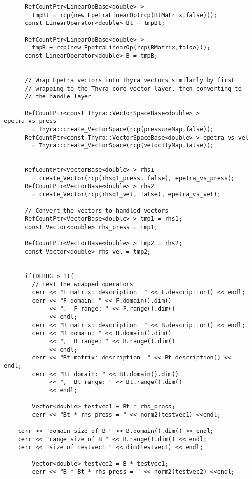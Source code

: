 \documentclass[oneeqnum,onefignum,onetabnum,10pt]{SANDreport}
\begin{document}
\begin{verbatim}
      RefCountPtr<LinearOpBase<double> >
        tmpBt = rcp(new EpetraLinearOp(rcp(BtMatrix,false)));
      const LinearOperator<double> Bt = tmpBt;

      RefCountPtr<LinearOpBase<double> >
        tmpB = rcp(new EpetraLinearOp(rcp(BMatrix,false)));
      const LinearOperator<double> B = tmpB;


      // Wrap Epetra vectors into Thyra vectors similarly by first
      // wrapping to the Thyra core vector layer, then converting to
      // the handle layer

      RefCountPtr<const Thyra::VectorSpaceBase<double> > epetra_vs_press
        = Thyra::create_VectorSpace(rcp(pressureMap,false));
      RefCountPtr<const Thyra::VectorSpaceBase<double> > epetra_vs_vel
        = Thyra::create_VectorSpace(rcp(velocityMap,false));


      RefCountPtr<VectorBase<double> > rhs1
        = create_Vector(rcp(rhsq1_press, false), epetra_vs_press);
      RefCountPtr<VectorBase<double> > rhs2
        = create_Vector(rcp(rhsq1_vel, false), epetra_vs_vel);

      // Convert the vectors to handled vectors
      RefCountPtr<VectorBase<double> > tmp1 = rhs1;
      const Vector<double> rhs_press = tmp1;

      RefCountPtr<VectorBase<double> > tmp2 = rhs2;
      const Vector<double> rhs_vel = tmp2;


      if(DEBUG > 1){
        // Test the wrapped operators
        cerr << "F matrix: description  " << F.description() << endl;
        cerr << "F domain: " << F.domain().dim() 
             << ",  F range: " << F.range().dim() 
             << endl;
        cerr << "B matrix: description  " << B.description() << endl;
        cerr << "B domain: " << B.domain().dim() 
             << ",  B range: " << B.range().dim() 
             << endl;
        cerr << "Bt matrix: description  " << Bt.description() << endl;
        cerr << "Bt domain: " << Bt.domain().dim() 
             << ",  Bt range: " << Bt.range().dim() 
             << endl;

        Vector<double> testvec1 = Bt * rhs_press;
        cerr << "Bt * rhs_press = " << norm2(testvec1) <<endl;

	cerr << "domain size of B " << B.domain().dim() << endl;
	cerr << "range size of B " << B.range().dim() << endl;
	cerr << "size of testvec1 " << dim(testvec1) << endl;

        Vector<double> testvec2 = B * testvec1;
        cerr << "B * Bt * rhs_press = " << norm2(testvec2) <<endl;


\end{verbatim}
\end{document}
